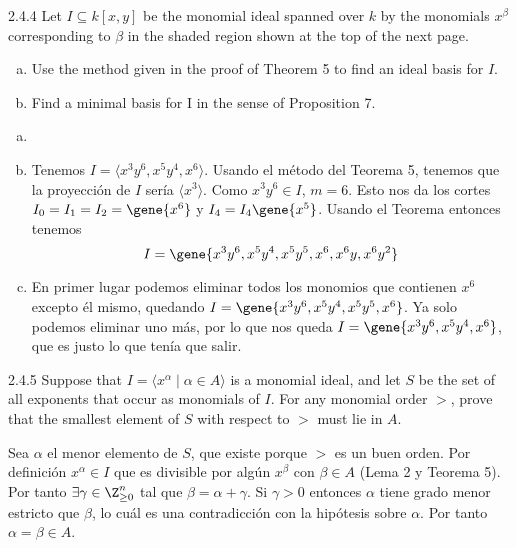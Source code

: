 \documentclass[twoside]{article}
\begin{document}
\newpage

\begin{ejercicio}{2.4.4}
Let $I ⊆ k[x, y]$ be the monomial ideal spanned over $k$ by the monomials $x^{β}$ corresponding
to $β$ in the shaded region shown at the top of the next page.
\begin{enumerate}[a.]
\item Use the method given in the proof of Theorem 5 to find an ideal basis for $I$.
\item Find a minimal basis for I in the sense of Proposition 7.
\end{enumerate}
\end{ejercicio}
\begin{solucion}
\begin{enumerate}[a.]
\item[]
\item Tenemos $I=\langle x^3y^6,x^5y^4, x^6\rangle$. Usando el método del Teorema 5, tenemos que la proyección de $I$ sería $\langle x^3\rangle$. Como $x^3y^6\in I$, $m=6$. Esto nos da los cortes $I_0=I_1=I_2=\gene{x^6}$ y $I_4=I_4\gene{x^5}$. Usando el Teorema entonces tenemos $$I=\gene{ x^3y^6,x^5y^4,x^5y^5, x^6,x^6y, x^6y^2}$$
\item En primer lugar podemos eliminar todos los monomios que contienen $x^6$ excepto él mismo, quedando $I=\gene{ x^3y^6,x^5y^4,x^5y^5, x^6}$. Ya solo podemos eliminar uno más, por lo que nos queda $I=\gene{ x^3y^6,x^5y^4, x^6}$, que es justo lo que tenía que salir.
\end{enumerate}
\end{solucion}
\newpage

\begin{ejercicio}{2.4.5}
Suppose that $I =\langle 
x^{α} \mid α ∈ A\rangle$ is a monomial ideal, and let $S$ be the set of all exponents
that occur as monomials of $I$. For any monomial order $>$, prove that the smallest element
of $S$ with respect to $>$ must lie in $A$.
\end{ejercicio}
\begin{solucion}
Sea $\alpha$ el menor elemento de $S$, que existe porque $>$ es un buen orden. Por definición $x^\alpha\in I$ que es divisible por algún $x^\beta$ con $\beta \in A$ (Lema 2 y Teorema 5). Por tanto $\exists \gamma \in \Z^n_{\geq 0}$ tal que $\beta  = \alpha + \gamma$. Si $\gamma>0$ entonces $\alpha$ tiene grado menor estricto que $\beta$, lo cuál es una contradicción con la hipótesis sobre $\alpha$. Por tanto $\alpha = \beta \in A$.
\end{solucion}
\end{document}
